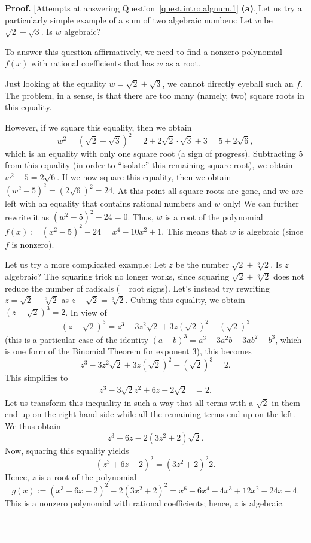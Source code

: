 \documentclass[numbers=enddot,12pt,final,onecolumn,notitlepage]{scrartcl}%
\numberwithin{exer}{section}
\theoremstyle{definition}
\newenvironment{proof}[1][Proof]{\noindent\textbf{#1.} }{\ \rule{0.5em}{0.5em}}
\begin{document}
\begin{proof}
[Attempts at answering Question~\ref{quest.intro.algnum.1} \textbf{(a)}.]Let
us try a particularly simple example of a sum of two algebraic numbers: Let
$w$ be $\sqrt{2} + \sqrt{3}$. Is $w$ algebraic?

To answer this question affirmatively, we need to find a nonzero polynomial
$f\left(  x \right)  $ with rational coefficients that has $w$ as a root.

Just looking at the equality $w = \sqrt{2} + \sqrt{3}$, we cannot directly
eyeball such an $f$. The problem, in a sense, is that there are too many
(namely, two) square roots in this equality.

However, if we square this equality, then we obtain
\[
w^{2}=\left(  \sqrt{2}+\sqrt{3}\right)  ^{2}=2+2\sqrt{2}\cdot\sqrt{3}+3
=5+2\sqrt{6},
\]
which is an equality with only one square root (a sign of progress).
Subtracting $5$ from this equality (in order to ``isolate'' this remaining
square root), we obtain $w^{2}-5=2\sqrt{6}$. If we now square this equality,
then we obtain $\left(  w^{2}-5\right)  ^{2}=\left(  2\sqrt{6}\right)
^{2}=24$. At this point all square roots are gone, and we are left with an
equality that contains rational numbers and $w$ only! We can further rewrite
it as $\left(  w^{2} - 5 \right)  ^{2} - 24 = 0$. Thus, $w$ is a root of the
polynomial $f\left(  x \right)  := \left(  x^{2}-5\right)  ^{2}-24 =
x^{4}-10x^{2}+1$. This means that $w$ is algebraic (since $f$ is nonzero).

Let us try a more complicated example: Let $z$ be the number $\sqrt
{2}+\sqrt[3]{2}$. Is $z$ algebraic? The squaring trick no longer works, since
squaring $\sqrt{2} + \sqrt[3]{2}$ does not reduce the number of radicals (=
root signs). Let's instead try rewriting $z = \sqrt{2} + \sqrt[3]{2}$ as
$z-\sqrt{2}=\sqrt[3]{2}$. Cubing this equality, we obtain $\left(  z-\sqrt
{2}\right)  ^{3} =2$. In view of
\begin{align*}
\left(  z-\sqrt{2}\right)  ^{3} = z^{3}-3z^{2}\sqrt{2}+3z\left(  \sqrt
{2}\right)  ^{2}-\left(  \sqrt{2}\right)  ^{3}%
\end{align*}
(this is a particular case of the identity $\left(  a-b\right)  ^{3}%
=a^{3}-3a^{2}b+3ab^{2}-b^{3}$, which is one form of the Binomial Theorem for
exponent $3$), this becomes
\[
z^{3}-3z^{2}\sqrt{2}+3z\left(  \sqrt{2}\right)  ^{2}-\left(  \sqrt{2}\right)
^{3} = 2.
\]
This simplifies to%
\begin{align*}
z^{3}-3\sqrt{2}z^{2}+6z-2\sqrt{2}  &  =2.
\end{align*}
Let us transform this inequality in such a way that all terms with a $\sqrt
{2}$ in them end up on the right hand side while all the remaining terms end
up on the left. We thus obtain
\[
z^{3}+6z-2 \left(  3z^{2}+2\right)  \sqrt{2} .
\]
Now, squaring this equality yields
\[
\left(  z^{3}+6z-2\right)  ^{2}=\left(  3z^{2}+2\right)  ^{2}2.
\]
Hence, $z$ is a root of the polynomial
\[
g\left(  x \right)  := \left(  x^{3}+6x-2\right)  ^{2}-2\left(  3x^{2}%
+2\right)  ^{2}=x^{6}-6x^{4}-4x^{3}+12x^{2}-24x-4.
\]
This is a nonzero polynomial with rational coefficients; hence, $z$ is algebraic.


\end{proof}
\end{document}
